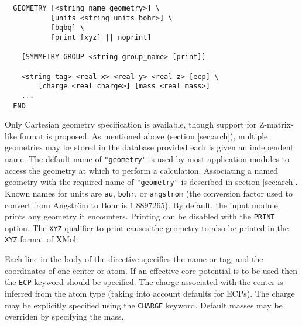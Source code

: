 
\begin{verbatim}
  GEOMETRY [<string name geometry>] \
           [units <string units bohr>] \
           [bqbq] \
           [print [xyz] || noprint]
    
    [SYMMETRY GROUP <string group_name> [print]]

    <string tag> <real x> <real y> <real z> [ecp] \
        [charge <real charge>] [mass <real mass>]
    ...
  END
\end{verbatim}

Only Cartesian geometry specification is available, though support for
Z-matrix-like format is proposed.  As mentioned above (section
\ref{sec:arch}), multiple geometries may be stored in the database
provided each is given an independent name.  The default name of
\verb+"geometry"+ is used by most application modules to access the
geometry at which to perform a calculation.  Associating a named
geometry with the required name of \verb+"geometry"+ is described in
section \ref{sec:arch}.  Known names for units are \verb+au+,
\verb+bohr+, or \verb+angstrom+ (the conversion factor used to convert
from Angstr\"{o}m to Bohr is $1.8897265$). By default, the input
module prints any geometry it encounters.  Printing can be disabled
with the \verb+PRINT+ option.  The \verb+XYZ+ qualifier to print
causes the geometry to also be printed in the \verb+XYZ+ format of
XMol.  

Each line in the body of the directive specifies the name or tag, and
the coordinates of one center or atom.  If an effective core potential
is to be used then the \verb+ECP+ keyword should be specified.  The
charge associated with the center is inferred from the atom type
(taking into account defaults for ECPs).  The charge may be explicitly
specified using the \verb+CHARGE+ keyword.  Default masses may be
overriden by specifying the mass.

